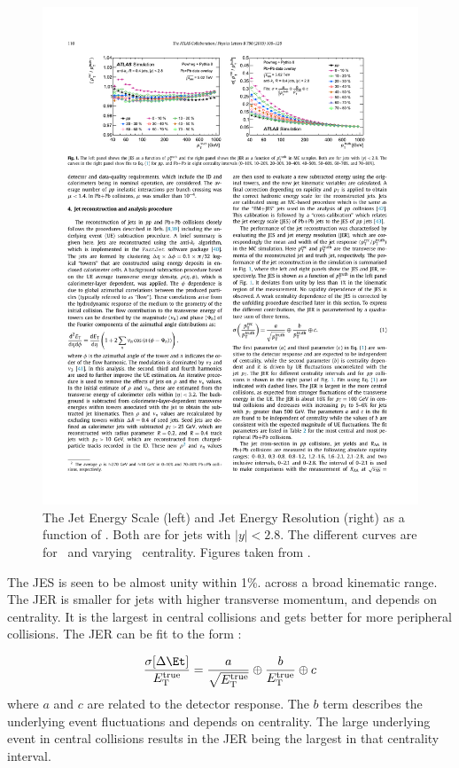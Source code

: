 \begin{figure}[htbp!]
	\centering
	\includegraphics[width=\textwidth]{figures/setup/jes_jer} %
	\caption{
	The Jet Energy Scale (left) and Jet Energy Resolution (right) as a function of \pttruth.
	Both are for jets with $|y| < 2.8$. The different curves are for \pp\ and varying \pbpb\ centrality.
	Figures taken from \cite{2019108}.}	
	\label{fig:jes_jer}%
\end{figure}
The JES is seen to be almost unity within 1\%. across a broad kinematic range.
The JER is smaller for jets with higher transverse momentum, and depends on centrality.
It is the largest in central collisions and gets better for more peripheral collisions.
The JER can be fit to the form \cite{Aad:hi_jets}:

\begin{align}
\frac{\sigma[\Delta \Et]}{E_{\rm T}^{\rm true}} = \frac{a}{\sqrt{E_{\rm T}^{\rm true}}} \oplus \frac{b}{E_{\rm T}^{\rm true}} \oplus c
\end{align}
where $a$ and $c$ are related to the detector response.
The $b$ term describes the underlying event fluctuations and depends on centrality.
The large underlying event in central collisions results in the JER being the largest in that centrality interval. 

